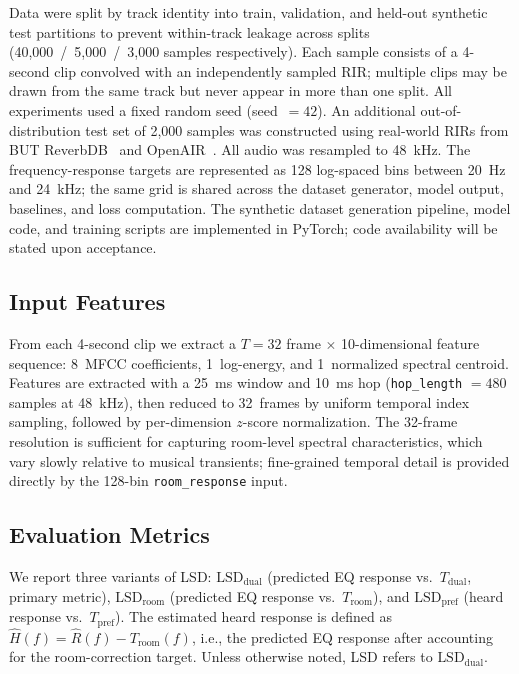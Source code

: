 \documentclass{aes2e}
\begin{document}
Data were split by track identity into train, validation, and held-out
synthetic test partitions to prevent within-track leakage across splits
(40{,}000~/~5{,}000~/~3{,}000 samples respectively).
Each sample consists of a 4-second clip convolved with an independently
sampled RIR; multiple clips may be drawn from the same track but never
appear in more than one split.
All experiments used a fixed random seed (seed~$= 42$).
An additional out-of-distribution test set of 2{,}000 samples was constructed
using real-world RIRs from BUT ReverbDB~\cite{szoke2019} and OpenAIR~\cite{openair2010}.
All audio was resampled to 48~kHz.
The frequency-response targets are represented as 128 log-spaced bins
between 20~Hz and 24~kHz; the same grid is shared across the dataset
generator, model output, baselines, and loss computation.
The synthetic dataset generation pipeline, model code, and training scripts
are implemented in PyTorch; code availability will be stated upon acceptance.

\subsection{Input Features}

From each 4-second clip we extract a $T = 32$ frame $\times$ 10-dimensional
feature sequence: 8~MFCC coefficients, 1~log-energy, and 1~normalized spectral
centroid.
Features are extracted with a 25~ms window and 10~ms hop
(\texttt{hop\_length} $= 480$ samples at 48~kHz), then reduced to
32~frames by uniform temporal index sampling, followed by per-dimension
$z$-score normalization.
The 32-frame resolution is sufficient for capturing room-level spectral
characteristics, which vary slowly relative to musical transients;
fine-grained temporal detail is provided directly by the 128-bin
\texttt{room\_response} input.

\subsection{Evaluation Metrics}

We report three variants of LSD:
$\text{LSD}_\text{dual}$ (predicted EQ response vs.\ $T_\text{dual}$,
primary metric), $\text{LSD}_\text{room}$ (predicted EQ response vs.\
$T_\text{room}$), and $\text{LSD}_\text{pref}$ (heard response vs.\
$T_\text{pref}$). The estimated heard response is defined as
$\hat{H}(f) = \hat{R}(f) - T_\text{room}(f)$, i.e., the predicted EQ
response after accounting for the room-correction target. Unless otherwise
noted, LSD refers to $\text{LSD}_\text{dual}$.
\end{document}
